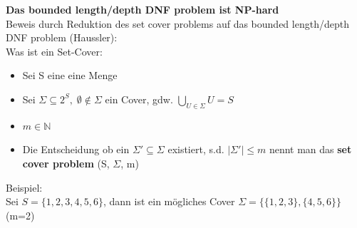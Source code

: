 \documentclass[12pt,a4paper]{article}
\newcommand{\nl}{\\[0.1cm]}
\begin{document}
\textbf{Das bounded length/depth DNF problem ist NP-hard}\\
Beweis durch Reduktion des set cover problems auf das bounded length/depth DNF problem (Haussler):\nl
Was ist ein Set-Cover:
\begin{itemize}
\item Sei S eine eine Menge
\item Sei $\Sigma \subseteq 2^S, \; \emptyset\not\in\Sigma$ ein Cover, gdw. $\displaystyle \bigcup_{U\in\Sigma} U = S$
\item $m\in\mathbb{N}$
\item Die Entscheidung ob ein $\Sigma' \subseteq \Sigma$ existiert, s.d. $|\Sigma'|\leq m$ nennt man das \textbf{set cover problem} (S, $\Sigma$, m)
\end{itemize}
Beispiel:\\
Sei $S = \{1,2, 3, 4, 5, 6\}$, dann ist ein mögliches Cover $\Sigma = \{\{1, 2, 3\},\{4, 5, 6\}\}$ (m=2)
\end{document}

